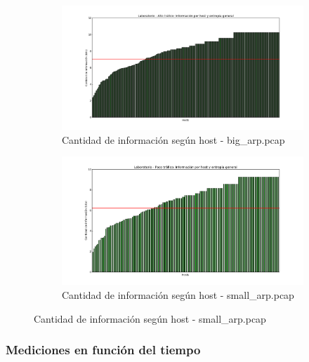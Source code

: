 \begin{figure}[H]
        \begin{subfigure}[H]{0.5\textwidth}
                \centering
                \includegraphics[width=1\textwidth]{graficos/infoHost_laboBig.png}
                \caption{Cantidad de informaci\'on seg\'un host - big\_arp.pcap}
                \label{fig:info3}
        \end{subfigure}
        \begin{subfigure}[H]{0.5\textwidth}
                \centering
                \includegraphics[width=1\textwidth]{graficos/infoHost_laboSmall.png}
                \caption{Cantidad de informaci\'on seg\'un host - small\_arp.pcap}
                \label{fig:info4}
        \end{subfigure}
\end{figure}

\subsubsection{Mediciones en funci\'on del tiempo}

